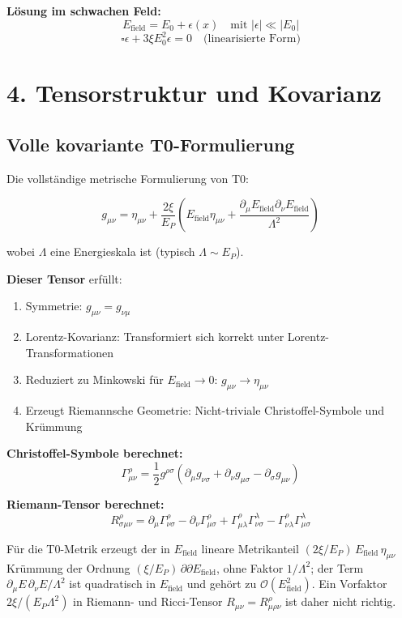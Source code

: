 	\textbf{Lösung im schwachen Feld:}
	\[
	E_{\text{field}} = E_0 + \epsilon(x) \quad \text{mit } |\epsilon| \ll |E_0|
	\]
	\[
	\square \epsilon + 3\xi E_0^2 \epsilon = 0 \quad \text{(linearisierte Form)}
	\]
	
	\section*{4. Tensorstruktur und Kovarianz}
	
	\subsection*{\textbf{Volle kovariante T0-Formulierung}}
	
	Die vollständige metrische Formulierung von T0:
	
	\[
	g_{\mu\nu} = \eta_{\mu\nu} + \frac{2\xi}{E_P} \left(E_{\text{field}} \eta_{\mu\nu} + \frac{\partial_\mu E_{\text{field}} \partial_\nu E_{\text{field}}}{\Lambda^2}\right)
	\]
	
	wobei $\Lambda$ eine Energieskala ist (typisch $\Lambda \sim E_P$).
	
	\textbf{Dieser Tensor} erfüllt:
	\begin{enumerate}[label=\checkmark]
		\item Symmetrie: $g_{\mu\nu} = g_{\nu\mu}$
		\item Lorentz-Kovarianz: Transformiert sich korrekt unter Lorentz-Transformationen
		\item Reduziert zu Minkowski für $E_{\text{field}} \to 0$: $g_{\mu\nu} \to \eta_{\mu\nu}$
		\item Erzeugt Riemannsche Geometrie: Nicht-triviale Christoffel-Symbole und Krümmung
	\end{enumerate}
	
	\textbf{Christoffel-Symbole berechnet:}
	\[
	\Gamma^\rho_{\mu\nu} = \frac{1}{2} g^{\rho\sigma} (\partial_\mu g_{\nu\sigma} + \partial_\nu g_{\mu\sigma} - \partial_\sigma g_{\mu\nu})
	\]
	
	\textbf{Riemann-Tensor berechnet:}
	\[
	R^\rho_{\sigma\mu\nu} = \partial_\mu \Gamma^\rho_{\nu\sigma} - \partial_\nu \Gamma^\rho_{\mu\sigma} + \Gamma^\rho_{\mu\lambda} \Gamma^\lambda_{\nu\sigma} - \Gamma^\rho_{\nu\lambda} \Gamma^\lambda_{\mu\sigma}
	\]
	
	Für die T0-Metrik erzeugt der in $E_{\text{field}}$ lineare Metrikanteil $(2\xi/E_P)\,E_{\text{field}}\,\eta_{\mu\nu}$ Krümmung der Ordnung $(\xi/E_P)\,\partial\partial E_{\text{field}}$, ohne Faktor $1/\Lambda^2$; der Term $\partial_\mu E\,\partial_\nu E/\Lambda^2$ ist quadratisch in $E_{\text{field}}$ und gehört zu $\mathcal{O}(E_{\text{field}}^2)$. Ein Vorfaktor $2\xi/(E_P\Lambda^2)$ in Riemann- und Ricci-Tensor $R_{\mu\nu} = R^\rho_{\mu\rho\nu}$ ist daher nicht richtig.
	
